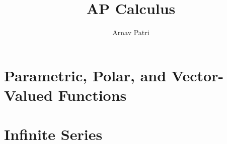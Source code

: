 \documentclass[12pt, A4]{report}
\author{Arnav Patri}
\title{AP Calculus}
\begin{document}
	\maketitle
		\tableofcontents
			\setcounter{part}{8}
			\chapter{Parametric, Polar, and Vector-Valued Functions}
				
			\chapter{Infinite Series}
				
\end{document}
